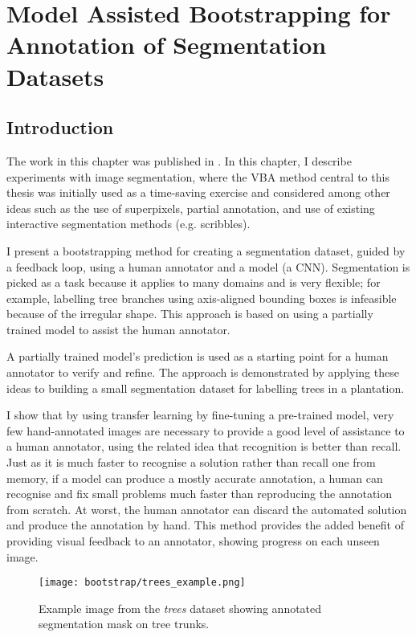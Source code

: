 \chapter{Model Assisted Bootstrapping for Annotation of Segmentation Datasets}
\label{chap:bootstrap} 
 
 
\section {Introduction}

The work in this chapter was published in \cite{Batchelorh}. In this chapter, I describe experiments with image segmentation, where the \gls{VBA} method central to this thesis was initially used as a time-saving exercise and considered among other ideas such as the use of superpixels, partial annotation, and use of existing interactive segmentation methods (e.g. scribbles).

I present a bootstrapping method for creating a segmentation dataset, guided by a feedback loop, using a human annotator and a model (a \gls{CNN}). Segmentation is picked as a task because it applies to many domains and is very flexible; for example, labelling tree branches using axis-aligned bounding boxes is infeasible because of the irregular shape. This approach is based on using a partially trained model to assist the human annotator.

 A partially trained model's prediction is used as a starting point for a human annotator to verify and refine. The approach is demonstrated by applying these ideas to building a small segmentation dataset for labelling trees in a plantation. 

I show that by using transfer learning by fine-tuning a pre-trained model, very few hand-annotated images are necessary to provide a good level of assistance to a human annotator, using the related idea that recognition is better than recall. Just as it is much faster to recognise a solution rather than recall one from memory, if a model can produce a mostly accurate annotation, a human can recognise and fix small problems much faster than reproducing the annotation from scratch. At worst, the human annotator can discard the automated solution and produce the annotation by hand. This method provides the added benefit of providing visual feedback to an annotator, showing progress on each unseen image.

\begin{figure}[ht]
\centering
\texttt{[image: bootstrap/trees\_example.png]}

\caption{Example image from the \emph{trees} dataset showing annotated segmentation mask on tree trunks. }
\label{fig:bootstrap_tree}
\end{figure}

